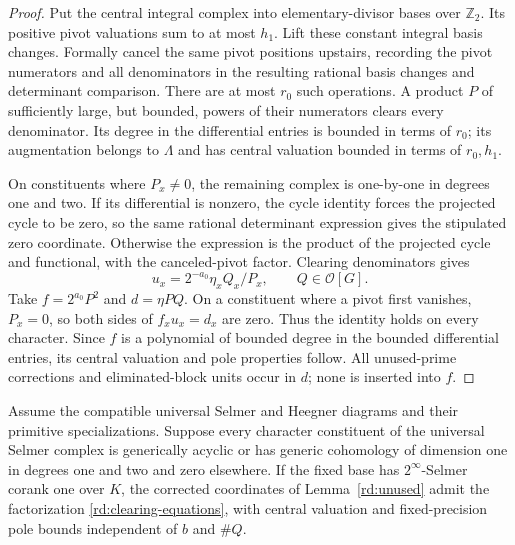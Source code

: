 \begin{proof}
Put the central integral complex into elementary-divisor
bases over \(\mathbb Z_2\).  Its positive pivot
valuations sum to at most \(h_1\).  Lift these
constant integral basis changes.  Formally cancel
the same pivot positions upstairs, recording the
pivot numerators and all denominators in the
resulting rational basis changes and determinant
comparison.  There are at most \(r_0\) such
operations.  A product \(P\) of sufficiently
large, but bounded, powers of their numerators
clears every denominator.  Its degree in the
differential entries is bounded in terms of
\(r_0\); its augmentation belongs to \(\Lambda\)
and has central valuation bounded in terms of
\(r_0,h_1\).

On constituents where \(P_x\ne0\), the remaining
complex is one-by-one in degrees one and two.
If its differential is nonzero, the cycle
identity forces the projected cycle to be zero,
so the same rational determinant expression
gives the stipulated zero coordinate.  Otherwise
the expression is the product of the projected
cycle and functional, with the canceled-pivot
factor.  Clearing denominators gives
\[
 u_x=2^{-a_0}\eta_x Q_x/P_x,\qquad
 Q\in\mathcal O[G].
 \]
Take \(f=2^{a_0}P^2\) and \(d=\eta P Q\).
On a constituent where a pivot first vanishes,
\(P_x=0\), so both sides of \(f_xu_x=d_x\)
are zero.  Thus the identity holds on every
character.  Since \(f\) is a polynomial of
bounded degree in the bounded differential
entries, its central valuation and pole
properties follow.  All unused-prime
corrections and eliminated-block units occur
in \(d\); none is inserted into \(f\).
\end{proof}

\begin{proposition}
\label{rd:family-clearing}
Assume the compatible universal Selmer and Heegner
diagrams and their primitive specializations.
Suppose every character constituent of the universal Selmer complex
is generically acyclic or has generic
cohomology of dimension one in degrees one and two and zero
elsewhere.  If the fixed base has \(2^\infty\)-Selmer corank
one over \(K\), the corrected coordinates of
Lemma~\ref{rd:unused} admit the factorization
\eqref{rd:clearing-equations}, with central
valuation and fixed-precision pole bounds
independent of \(b\) and \(\#Q\).
\end{proposition}

